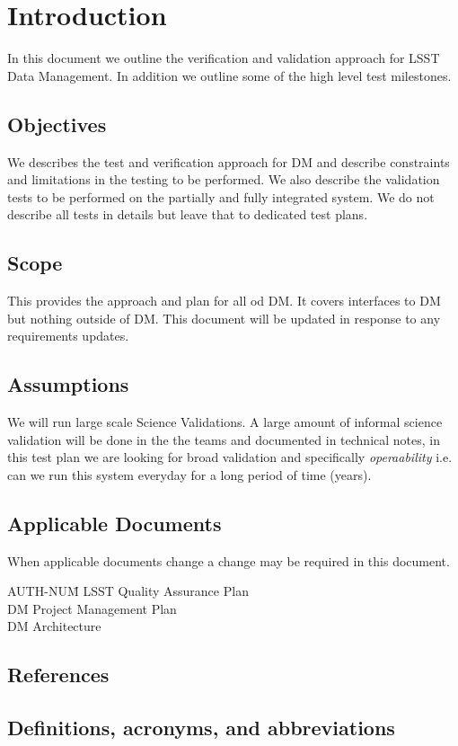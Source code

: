 
\section{Introduction \label{sect:intro}}
In this document  we outline the verification and validation approach for LSST Data Management. In addition we outline some of the high level test milestones. 


\subsection{Objectives \label{sect:objectives}}

We describes the test and verification approach for DM and describe  constraints and limitations in the testing to be performed. 
We also describe the validation tests to be performed on the partially and fully integrated system. 
We do not describe all tests in details but leave that to dedicated test plans.

\subsection{Scope \label{sect:scope}}

This provides the approach and plan for all od DM. It covers interfaces to DM but nothing outside of DM. 
This document will be updated in response to any  requirements updates.

\subsection{Assumptions}  
 We will run large scale Science Validations. A large amount of informal science validation will be done in the the teams and documented in technical notes, in this test plan we are looking for broad validation and specifically {\em operaability} i.e. can we run this system everyday for a long period of time (years).

\subsection{Applicable Documents \label{sect:ad}}
When applicable documents change a change may be required in this document.
\begin{tabbing}
AUTH-NUM\= \kill 
{}\>	LSST Quality  Assurance Plan \\
 \>	DM Project Management Plan   \\
\>	DM Architecture\\
\end{tabbing}

\subsection{References}

\renewcommand{\refname}{}


\subsection{Definitions, acronyms, and abbreviations \label{sect:acronyms}} 





